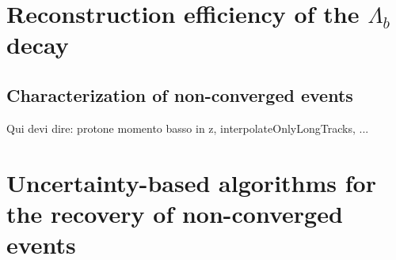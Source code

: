 \section{Reconstruction efficiency of the \texorpdfstring{$\Lambda_b$}{Lambdab} decay}

\subsection{Characterization of non-converged events}
Qui devi dire: protone momento basso in z, interpolateOnlyLongTracks, ...

\section{Uncertainty-based algorithms for the recovery of non-converged events}
